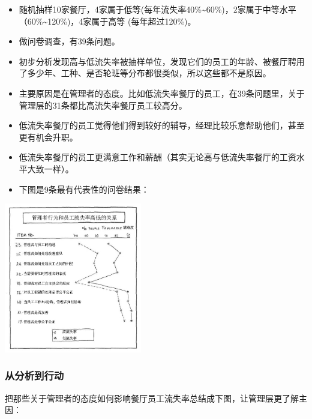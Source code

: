\begin{itemize}
\tightlist
\item
  随机抽样10家餐厅，4家属于低等(每年流失率40\%\textasciitilde{}60\%)，2家属于中等水平（60\%\textasciitilde{}120\%)，4家属于高等
  (每年超过120\%)。
\item
  做问卷调查，有39条问题。
\item
  初步分析发现高与低流失率被抽样单位，发现它们的员工的年龄、被餐厅聘用了多少年、工种、是否轮班等分布都很类似，所以这些都不是原因。
\item
  主要原因是在管理者的态度。比如低流失率餐厅的员工，在39条问题里，关于管理层的31条都比高流失率餐厅员工较高分。
\item
  低流失率餐厅的员工觉得他们得到较好的辅导，经理比较乐意帮助他们，甚至更有机会升职。
\item
  低流失率餐厅的员工更满意工作和薪酬（其实无论高与低流失率餐厅的工资水平大致一样）。
\item
  下图是9条最有代表性的问卷结果：
\end{itemize}


\includegraphics[width=6cm]{WeisbordP2182.jpg}

\hypertarget{ux4eceux5206ux6790ux5230ux884cux52a8}{%
\subsubsection{从分析到行动}\label{ux4eceux5206ux6790ux5230ux884cux52a8}}

把那些关于管理者的态度如何影响餐厅员工流失率总结成下图，让管理层更了解主因：\\

